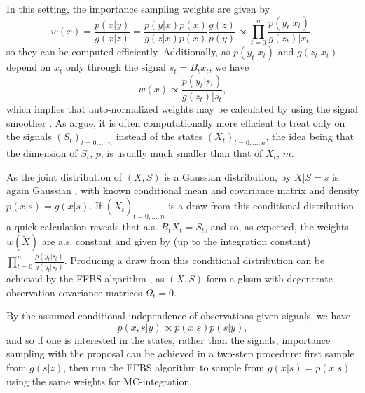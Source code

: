 In this setting, the importance sampling weights are given by 
$$
w(x) = \frac{p(x|y)}{g(x|z)} = \frac{p(y|x)p(x)}{g(z|x)p(x)} \frac{g(z)}{p(y)} \propto \prod_{t = 0}^n \frac{p(y_{t}|x_{t})}{g(z_{t})|x_{t}},
$$
so they can be computed efficiently. Additionally, as  $p(y_{t}|x_{t})$ and $g(z_{t}|x_{t})$ depend on $x_{t}$ only through the signal $s_{t} = B_{t}x_{t}$, we have 
$$
w(x) \propto \frac{p(y_{t}|s_{t})}{g(z_{t})|s_{t}},
$$
which implies that auto-normalized weights may be calculated by using the signal smoother \cite[Theorem 2]{Jungbacker2007Monte}.
As \citeauthor{Durbin2012Time} \cite[Section 4.5.3]{Durbin2012Time} argue, it is often computationally more efficient to treat only on the signals $\left(S_{t}\right)_{t=0,\dots,n}$ instead of the states $ \left( X_{t}  \right)_{t = 0, \dots, n}$, the idea being that the dimension of $S_{t}$, $p$, is usually much smaller than that of $X_{t}$, $m$. 

As the joint distribution of $(X, S)$ is a Gaussian distribution, by  $X|S = s$ is again Gaussian , with known conditional mean and covariance matrix and density $p(x|s) = g(x|s)$. If $(\tilde X_{t})_{t=0,\dots,n}$ is a draw from this conditional distribution a quick calculation reveals that a.s. $B_{t} \tilde X_{t} = S_{t}$, and so, as expected, the weights $w(\tilde X)$ are a.s. constant and given by (up to the integration constant) $\prod_{t = 0}^{n}\frac{p(y_{t}|s_{t})}{g(y_{t}|s_{t})}$. Producing a draw from this conditional distribution can be achieved by the FFBS algorithm , as $(X, S)$ form a \gls{glssm} with degenerate observation covariance matrices $\Omega_{t} = 0$.

By the assumed conditional independence of observations given signals, we have
$$
p(x, s|y) \propto p(x|s) p(s|y),
$$
and so if one is interested in the states, rather than the signals, importance sampling with the proposal  can be achieved in a two-step procedure: first sample from $g(s|z)$, then run the FFBS algorithm to sample from $g(x|s) = p(x|s)$ using the same weights for MC-integration. 




